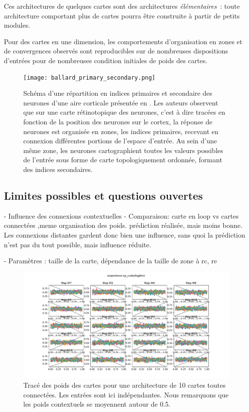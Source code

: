 \documentclass[../main]{subfiles}
\begin{document}
Ces architectures de quelques cartes sont des architectures \emph{élémentaires}~: toute architecture comportant plus de cartes pourra être construite à partir de petits modules.

Pour des cartes en une dimension, les comportements d'organisation en zones et de convergences observés sont reproducibles sur de nombreuses dispositions d'entrées pour de nombreuses condition initiales de poids des cartes.


\begin{figure}
	\centering\texttt{[image: ballard\_primary\_secondary.png]}
	\caption{Schéma d'une répartition en indices primaires et secondaire des neurones d'une aire corticale présentée en \cite{ballard_cortical_1986}. Les auteurs observent que sur une carte rétinotopique des neurones, c'est à dire tracées en fonction de la position des neurones sur le cortex, la réponse de neurones est organisée en zones, les indices primaires, recevant en connexion différentes portions de l'espace d'entrée. Au sein d'une même zone, les neurones cartographient toutes les valeurs possibles de l'entrée sous forme de carte topologiquement ordonnée, formant des indices secondaires.\label{fig:ballard}}
\end{figure}

\subsection{Limites possibles et questions ouvertes}

- Influence des connexions contextuelles 
- Comparaison: carte en loop vs cartes connectées ,meme organisation des poids. prédiction réalisée, mais moins bonne. Les connexions distantes gardent donc bien une influence, sans quoi la prédiction n'est pas du tout possible, mais influence réduite.


- Paramètres : taille de la carte, dépendance de la taille de zone à rc, re


\begin{figure}
	\includegraphics[width=\textwidth]{xp_cube_bigdim.pdf}
	\caption{Tracé des poids des cartes pour une architecture de 10 cartes toutes connectées. Les entrées sont ici indépendantes. Nous remarquons que les poids contextuels se moyennent autour de 0.5.}
\end{figure}
\end{document}

